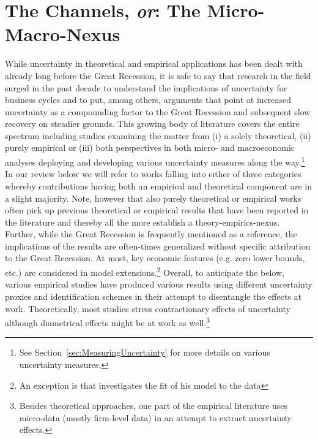 \documentclass[a4paper,11pt,listof=nochaptergap,oneside,pointednumbers,bibtotoc,bigheadings,liststotoc]{scrbook}
\theoremstyle{mysatz}
\theoremstyle{mydefinition}
\theoremstyle{mybemerkung}
\begin{document}
\chapter{The Channels, \textit{or}: The Micro-Macro-Nexus}
\label{sec:UncertaintyandBusinessCyclesRelatedLiterature}

While uncertainty in theoretical and empirical applications has been dealt with already long before the Great Recession, it is safe to say that research in the field surged in the past decade to understand the implications of uncertainty for business cycles and to put, among others, arguments that point at increased uncertainty as a compounding factor to the Great Recession and subsequent slow recovery on steadier grounds. This growing body of literature covers the entire spectrum including studies examining the matter from (i) a solely theoretical, (ii) purely empirical or (iii) both perspectives in both micro- and macroeconomic analyses deploying and developing various uncertainty measures along the way.\footnote{See Section~\ref{sec:MeasuringUncertainty} for more details on various uncertainty measures.} In our review below we will refer to works falling into either of three categories whereby contributions having both an empirical and theoretical component are in a slight majority.  Note, however that also purely theoretical or empirical works often pick up previous theoretical or empirical results that have been reported in the literature and thereby all the more establish a theory-empirics-nexus. Further, while the Great Recession is frequently mentioned as a reference, the implications of the results are often-times generalized without specific attribution to the Great Recession. At most, key economic features (e.g. zero lower bounds, etc.) are considered in model extensions.\footnote{An exception is \citet{schaal:17} that investigates the fit of his model to the data  } Overall, to anticipate the below, various empirical studies have produced various results using different uncertainty proxies and identification schemes in their attempt to disentangle the effects at work. Theoretically, most studies stress contractionary effects of uncertainty although diametrical effects might be at work as well.\footnote{Besides theoretical approaches, one part of the empirical literature uses micro-data (mostly firm-level data) in an attempt to extract uncertainty effects.}
\end{document}
